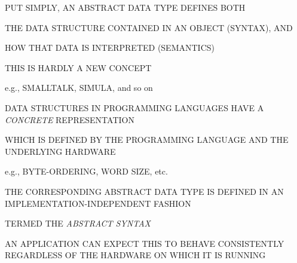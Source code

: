 \begin{bwslide}

\begin{nrtc}
\item	PUT SIMPLY, AN ABSTRACT DATA TYPE DEFINES BOTH
    \begin{nrtc}
    \item	THE DATA STRUCTURE CONTAINED IN AN OBJECT (SYNTAX), AND

    \item	HOW THAT DATA IS INTERPRETED (SEMANTICS)
    \end{nrtc}

\item	THIS IS HARDLY A NEW CONCEPT
    \begin{nrtc}
    \item	e.g., SMALLTALK, SIMULA, and so on
    \end{nrtc}
\end{nrtc}
\end{bwslide}


\begin{bwslide}

\begin{nrtc}
\item	DATA STRUCTURES IN PROGRAMMING LANGUAGES HAVE A \emph{CONCRETE}
	REPRESENTATION
    \begin{nrtc}
    \item	WHICH IS DEFINED BY THE PROGRAMMING LANGUAGE AND THE
		UNDERLYING HARDWARE

    \item	e.g., BYTE-ORDERING, WORD SIZE, etc.
    \end{nrtc}

\item	THE CORRESPONDING ABSTRACT DATA TYPE IS DEFINED IN AN
	IMPLEMENTATION-INDEPENDENT FASHION
    \begin{nrtc}
    \item	TERMED THE \emph{ABSTRACT SYNTAX}
    \end{nrtc}

\item	AN APPLICATION CAN EXPECT THIS TO BEHAVE CONSISTENTLY REGARDLESS OF THE
	HARDWARE ON WHICH IT IS RUNNING
\end{nrtc}
\end{bwslide}




